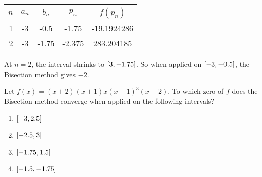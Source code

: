 \documentclass[../../Assignments.tex]{subfiles}
\begin{document}
\begin{solution}
\begin{enumerate}[label = (\alph*)]
            \begin{table}[H]
                \centering
                \begin{tabular}{r S[table-format=-1] S[table-format=-1.2] S[table-format=-1.3] S[table-format=-2.7]}
                    \toprule
                    \(n\)  &   {\(a_n\)}   &   {\(b_n\)}   &   {\(p_n\)}   &  {\(f(p_n)\)}  \\
                      &  -3           &  -0.5         &  -1.75        &  -19.1924286   \\
                        2  &  -3           &  -1.75        &  -2.375       &  283.204185    \\
                    \bottomrule
                \end{tabular}
            \end{table}

            At \(n = 2\), the interval shrinks to
            \(\interval{\-3}{\num{-1.75}}\). So when applied on
            \(\interval{-3}{\num{-0.5}}\), the Bisection method gives \(-2\).
    \end{enumerate}
\end{solution}

\begin{exercise}
    Let \(f(x) = (x + 2) (x+1) x (x - 1)^3 (x - 2)\). To which zero of \(f\)
    does the Bisection method converge when applied on the following intervals?

    \begin{multicols}{2}
        \begin{enumerate}[label = (\alph*)]
            \item \(\interval{-3}{\num{2.5}}\)
            \item \(\interval{\num{-2.5}}{3}\)
            \item \(\interval{\num{-1.75}}{\num{1.5}}\)
            \item \(\interval{\num{-1.5}}{\num{-1.75}}\)
        \end{enumerate}
    \end{multicols}
\end{exercise}
\end{document}
